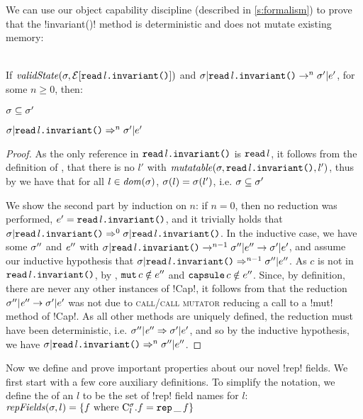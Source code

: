 	\LS
		We can use our object capability discipline (described in \autoref{s:formalism}) to prove that the \Q!invariant()! method is deterministic and does not mutate existing memory:%
	\SS\begin{Lemma}[Determinism]\ \\
	\indent If $\mathit{validState}(\sigma, \mathcal{E}[\texttt{read}\,l\texttt{.} \texttt{invariant}\texttt{(}\texttt{)}])$ and $\sigma|\texttt{read}\,l\texttt{.} \texttt{invariant}\texttt{(}\texttt{)} \rightarrow^{n} \sigma'|e'$, for some $n \geq 0$, then:
	\begin{iitemize}
		\item $\sigma \subseteq \sigma'$\SS
		\item $\sigma|\texttt{read}\,l\texttt{.} \texttt{invariant}\texttt{(}\texttt{)} \Rightarrow^{n} \sigma'|e'$
	\end{iitemize}
	\end{Lemma}\SS
	\begin{proof}
	As the only reference in $\texttt{read}\,l\texttt{.} \texttt{invariant}\texttt{(}\texttt{)}$ is $\texttt{read}\,l$, it follows from the definition of \muty, that there is no $l'$ with $\mathit{mutatable}(\sigma, \texttt{read}\,l\texttt{.} \texttt{invariant}\texttt{(}\texttt{)}, l')$, thus by  we have that for all $l \in \mathit{dom}(\sigma)$, $\sigma(l) = \sigma(l')$, i.e. $\sigma \subseteq \sigma'$

	We show the second part by induction on $n$: if $n = 0$, then no reduction was performed, $e' = \texttt{read}\,l\texttt{.} \texttt{invariant}\texttt{(}\texttt{)}$, and it trivially holds that $\sigma|\texttt{read}\,l\texttt{.} \texttt{invariant}\texttt{(}\texttt{)} \Rightarrow^{0} \sigma|\texttt{read}\,l\texttt{.} \texttt{invariant}\texttt{(}\texttt{)}$. In the inductive case, we have some $\sigma''$ and $\mathit{e}''$ with $\sigma|\texttt{read}\,l\texttt{.} \texttt{invariant}\texttt{(}\texttt{)} \rightarrow^{n - 1} \sigma''|e'' \rightarrow \sigma'|e'$, and assume our inductive hypothesis that $\sigma|\texttt{read}\,l\texttt{.} \texttt{invariant}\texttt{(}\texttt{)} \Rightarrow^{n - 1} \sigma''|e''$.
	As $c$ is not \muty in $\texttt{read}\,l\texttt{.} \texttt{invariant}\texttt{(}\texttt{)}$, by , $\texttt{mut}\,c \notin e''$ and $\texttt{capsule}\,c \notin e''$. Since, by definition, there are never any other instances of \Q!Cap!, it follows from  that the reduction $\sigma''|\mathit{e}'' \rightarrow \sigma'|e'$ was not due to \textsc{call/call mutator} reducing a call to a \Q!mut! method of \Q!Cap!.
	As all other methods are uniquely defined, the reduction must have been deterministic, i.e.  $\sigma''|\mathit{e}'' \Rightarrow \sigma'|e'$, and so by the inductive hypothesis, we have $\sigma|\texttt{read}\,l\texttt{.} \texttt{invariant}\texttt{(}\texttt{)} \Rightarrow^{n} \sigma''|e''$.
	\end{proof}

Now we define and prove important properties about our novel \Q!rep! fields. We first start with a few core auxiliary definitions.
To simplify the notation, we define the \rf of an $l$ to be the set of \Q!rep! field names for $l$:\\
\indent $\mathit{repFields}(\sigma,l) = \{f  \text{ where } \mathrm{C}^{\sigma}_{l}.f = \texttt{rep}\,\_\,f\}$
\LS

